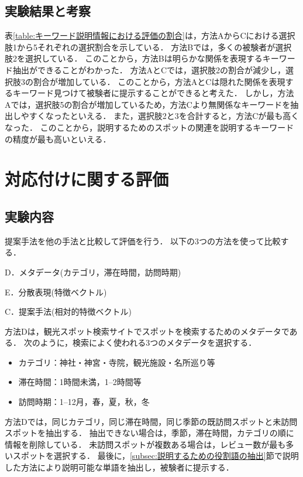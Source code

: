 \documentclass[submit]{ipsj}
\begin{document}
\subsection{実験結果と考察}
表\ref{table:キーワード説明情報における評価の割合}は，方法AからCにおける選択肢1から5それぞれの選択割合を示している．
方法Bでは，多くの被験者が選択肢2を選択している．
このことから，方法Bは明らかな関係を表現するキーワード抽出ができることがわかった．
方法AとCでは，選択肢2の割合が減少し，選択肢3の割合が増加している．
このことから，方法AとCは隠れた関係を表現するキーワード見つけて被験者に提示することができると考えた．
しかし，方法Aでは，選択肢5の割合が増加しているため，方法Cより無関係なキーワードを抽出しやすくなったといえる．
また，選択肢2と3を合計すると，方法Cが最も高くなった．
このことから，説明するためのスポットの関連を説明するキーワードの精度が最も高いといえる．

\section{対応付けに関する評価}
\label{sec:対応付けに関する評価}
\subsection{実験内容}
提案手法を他の手法と比較して評価を行う．
以下の3つの方法を使って比較する．
\begin{description}
  \item D．メタデータ(カテゴリ，滞在時間，訪問時期)
  \item E．分散表現(特徴ベクトル)
  \item C．提案手法(相対的特徴ベクトル)
\end{description}

方法Dは，観光スポット検索サイトでスポットを検索するためのメタデータである．
次のように，検索によく使われる3つのメタデータを選択する．
\begin{itemize}
 \item カテゴリ：神社・神宮・寺院，観光施設・名所巡り等
 \item 滞在時間：1時間未満，1--2時間等
 \item 訪問時期：1--12月，春，夏，秋，冬
\end{itemize}

方法Dでは，同じカテゴリ，同じ滞在時間，同じ季節の既訪問スポットと未訪問スポットを抽出する．
抽出できない場合は，季節，滞在時間，カテゴリの順に情報を削除している．
未訪問スポットが複数ある場合は，レビュー数が最も多いスポットを選択する．
最後に，\ref{subsec:説明するための役割語の抽出}節で説明した方法により説明可能な単語を抽出し，被験者に提示する．
\end{document}
